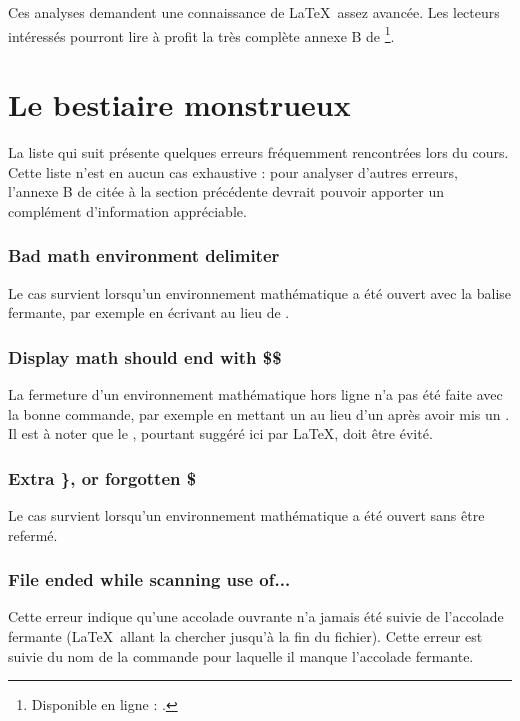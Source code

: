 Ces analyses demandent une connaissance de \LaTeX\ assez avancée. Les lecteurs intéressés pourront lire à profit la très complète annexe B de \cite{gomi}\footnote{Disponible en ligne : .}.

\section{Le bestiaire monstrueux}

La liste qui suit présente quelques erreurs fréquemment rencontrées lors du cours. Cette liste n'est en aucun cas exhaustive : pour analyser d'autres erreurs, l'annexe B de \cite{gomi} citée à la section précédente devrait pouvoir apporter un complément d'information appréciable.

\subsubsection{Bad math environment delimiter}

Le cas survient lorsqu'un environnement mathématique a été ouvert avec la balise fermante, par exemple en écrivant \macro{]} au lieu de \macro{[}.

\subsubsection{Display math should end with \$\$}

La fermeture d'un environnement mathématique hors ligne n'a pas été faite avec la bonne commande, par exemple en mettant un \macron{\$} au lieu d'un \macro{]} après avoir mis un \macro{[}. Il est à noter que le \macron{\$\$}, pourtant suggéré ici par \LaTeX, doit être évité.

\subsubsection{Extra \}, or forgotten \$}

Le cas survient lorsqu'un environnement mathématique a été ouvert sans être refermé.

\subsubsection{File ended while scanning use of...}

Cette erreur indique qu'une accolade ouvrante n'a jamais été suivie de l'accolade fermante (\LaTeX\ allant la chercher jusqu'à la fin du fichier). Cette erreur est suivie du nom de la commande pour laquelle il manque l'accolade fermante.

